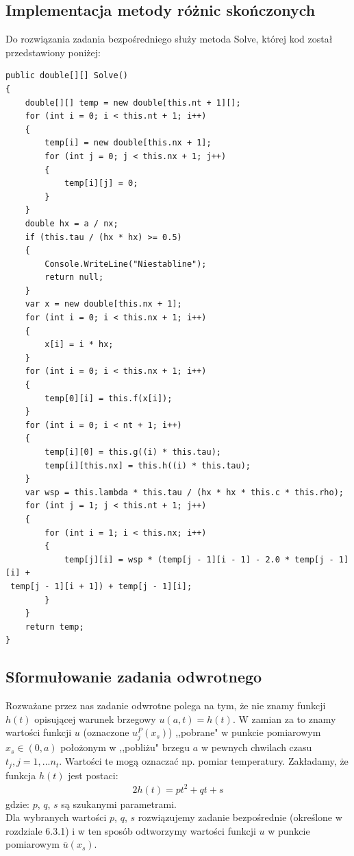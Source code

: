 \documentclass[twoside]{projektInzynierskiMS1}
\newcommand{\si}{ś}
\begin{document}
\subsection{Implementacja metody różnic skończonych}

Do rozwiązania zadania bezpośredniego służy metoda Solve, której kod został przedstawiony poniżej:

\begin{verbatim}
public double[][] Solve()
{
    double[][] temp = new double[this.nt + 1][];
    for (int i = 0; i < this.nt + 1; i++)
    {
        temp[i] = new double[this.nx + 1];
        for (int j = 0; j < this.nx + 1; j++)
        {
            temp[i][j] = 0;
        }
    }
    double hx = a / nx;
    if (this.tau / (hx * hx) >= 0.5)
    {
        Console.WriteLine("Niestabline");
        return null;
    }
    var x = new double[this.nx + 1];
    for (int i = 0; i < this.nx + 1; i++)
    {
        x[i] = i * hx;
    }
    for (int i = 0; i < this.nx + 1; i++)
    {
        temp[0][i] = this.f(x[i]);
    }
    for (int i = 0; i < nt + 1; i++)
    {
        temp[i][0] = this.g((i) * this.tau);
        temp[i][this.nx] = this.h((i) * this.tau);
    }
    var wsp = this.lambda * this.tau / (hx * hx * this.c * this.rho);
    for (int j = 1; j < this.nt + 1; j++)
    {
        for (int i = 1; i < this.nx; i++)
        {
            temp[j][i] = wsp * (temp[j - 1][i - 1] - 2.0 * temp[j - 1][i] +
 temp[j - 1][i + 1]) + temp[j - 1][i];
        }
    }
    return temp;
}   
\end{verbatim}

\subsection{Sformułowanie zadania odwrotnego}

Rozważane przez nas zadanie odwrotne polega na tym, że nie znamy funkcji $h(t)$ opisującej warunek brzegowy $u(a, t) = h(t)$.
W zamian za to znamy wartości funkcji $u$ (oznaczone $u^P_j(x_s)$) ,,pobrane" w punkcie pomiarowym $x_s \in (0, a)$
położonym w ,,pobliżu" brzegu $a$ w pewnych chwilach czasu $t_j, j = 1, ... n_t$. Wartości te mogą oznaczać np. pomiar temperatury.
Zakładamy, że funkcja $h(t)$ jest postaci: \\
\begin{alignat*}{2}
h(t) = pt^2 +qt  + s
\end{alignat*}
gdzie: $p$, $q$, $s$ są szukanymi parametrami. \\

Dla wybranych wartości $p$, $q$, $s$ rozwiązujemy zadanie bezpośrednie (okre\si lone w rozdziale 6.3.1) i w ten sposób odtworzymy wartości funkcji $u$ w punkcie pomiarowym $\overline u (x_s)$. \\
\end{document}
